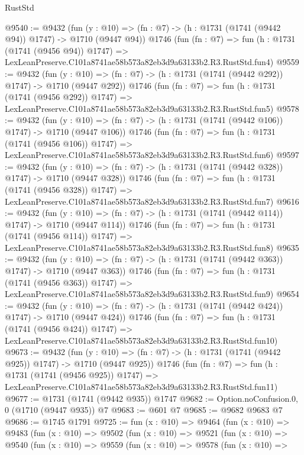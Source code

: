 \begin{lexlean}{RustStd}
\begin{coremodule}
@9540 := @9432
    (fun (y : @10) => (fn : @7) -> (h : @1731 (@1741 (@9442 @94)) @1747) -> @1710 (@9447 @94))
    @1746
    (fun (fn : @7) =>
    fun (h : @1731 (@1741 (@9456 @94)) @1747) =>
    LexLeanPreserve.C101a8741ae58b573a82eb3d9a63133b2.R3.RustStd.fun4)
@9559 := @9432
    (fun (y : @10) => (fn : @7) -> (h : @1731 (@1741 (@9442 @292)) @1747) -> @1710 (@9447 @292))
    @1746
    (fun (fn : @7) =>
    fun (h : @1731 (@1741 (@9456 @292)) @1747) =>
    LexLeanPreserve.C101a8741ae58b573a82eb3d9a63133b2.R3.RustStd.fun5)
@9578 := @9432
    (fun (y : @10) => (fn : @7) -> (h : @1731 (@1741 (@9442 @106)) @1747) -> @1710 (@9447 @106))
    @1746
    (fun (fn : @7) =>
    fun (h : @1731 (@1741 (@9456 @106)) @1747) =>
    LexLeanPreserve.C101a8741ae58b573a82eb3d9a63133b2.R3.RustStd.fun6)
@9597 := @9432
    (fun (y : @10) => (fn : @7) -> (h : @1731 (@1741 (@9442 @328)) @1747) -> @1710 (@9447 @328))
    @1746
    (fun (fn : @7) =>
    fun (h : @1731 (@1741 (@9456 @328)) @1747) =>
    LexLeanPreserve.C101a8741ae58b573a82eb3d9a63133b2.R3.RustStd.fun7)
@9616 := @9432
    (fun (y : @10) => (fn : @7) -> (h : @1731 (@1741 (@9442 @114)) @1747) -> @1710 (@9447 @114))
    @1746
    (fun (fn : @7) =>
    fun (h : @1731 (@1741 (@9456 @114)) @1747) =>
    LexLeanPreserve.C101a8741ae58b573a82eb3d9a63133b2.R3.RustStd.fun8)
@9635 := @9432
    (fun (y : @10) => (fn : @7) -> (h : @1731 (@1741 (@9442 @363)) @1747) -> @1710 (@9447 @363))
    @1746
    (fun (fn : @7) =>
    fun (h : @1731 (@1741 (@9456 @363)) @1747) =>
    LexLeanPreserve.C101a8741ae58b573a82eb3d9a63133b2.R3.RustStd.fun9)
@9654 := @9432
    (fun (y : @10) => (fn : @7) -> (h : @1731 (@1741 (@9442 @424)) @1747) -> @1710 (@9447 @424))
    @1746
    (fun (fn : @7) =>
    fun (h : @1731 (@1741 (@9456 @424)) @1747) =>
    LexLeanPreserve.C101a8741ae58b573a82eb3d9a63133b2.R3.RustStd.fun10)
@9673 := @9432
    (fun (y : @10) => (fn : @7) -> (h : @1731 (@1741 (@9442 @925)) @1747) -> @1710 (@9447 @925))
    @1746
    (fun (fn : @7) =>
    fun (h : @1731 (@1741 (@9456 @925)) @1747) =>
    LexLeanPreserve.C101a8741ae58b573a82eb3d9a63133b2.R3.RustStd.fun11)
@9677 := @1731 (@1741 (@9442 @935)) @1747
@9682 := Option.noConfusion.{0, 0} (@1710 (@9447 @935)) @7
@9683 := @601 @7
@9685 := @9682 @9683 @7
@9686 := @1745 @1791
@9725 := fun (x : @10) =>
  @9464
    (fun (x : @10) =>
    @9483
      (fun (x : @10) =>
      @9502
        (fun (x : @10) =>
        @9521
          (fun (x : @10) =>
          @9540
            (fun (x : @10) =>
            @9559
              (fun (x : @10) =>
              @9578
                (fun (x : @10) =>

\end{coremodule}
\end{lexlean}
